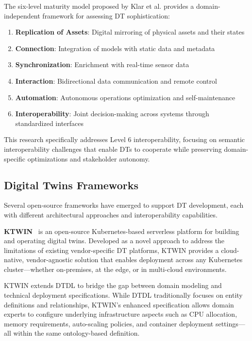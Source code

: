 The six-level maturity model proposed by Klar et al. \cite{Klar_2024} provides a domain-independent framework for assessing DT sophistication:
\begin{enumerate}
    \item \textbf{Replication of Assets}: Digital mirroring of physical assets and their states
    \item \textbf{Connection}: Integration of models with static data and metadata
    \item \textbf{Synchronization}: Enrichment with real-time sensor data
    \item \textbf{Interaction}: Bidirectional data communication and remote control
    \item \textbf{Automation}: Autonomous operations optimization and self-maintenance
    \item \textbf{Interoperability}: Joint decision-making across systems through standardized interfaces
\end{enumerate}

This research specifically addresses Level 6 interoperability,
    focusing on semantic interoperability challenges that enable DTs to cooperate while 
    preserving domain-specific optimizations and stakeholder autonomy.

\subsection{Digital Twins Frameworks}

Several open-source frameworks have emerged to support DT development, each with different
    architectural approaches and interoperability capabilities.

\textbf{KTWIN}~\cite{Wermann_Wickboldt_2025}
    is an open-source Kubernetes-based serverless platform for building and operating digital twins.
Developed as a novel approach to address the limitations of existing vendor-specific DT platforms,
    KTWIN provides a cloud-native, vendor-agnostic solution that enables deployment across 
    any Kubernetes cluster—whether on-premises, at the edge, or in multi-cloud environments.

KTWIN extends DTDL to bridge the gap between 
    domain modeling and technical deployment specifications.
While DTDL traditionally focuses on entity definitions and relationships,
    KTWIN's enhanced specification allows domain experts to configure
    underlying infrastructure aspects such as CPU allocation, memory requirements, 
    auto-scaling policies, and container deployment settings—all within the same ontology-based definition.

